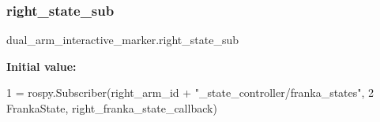 \subsubsection{\texorpdfstring{right\+\_\+state\+\_\+sub}{right\_state\_sub}}
{\footnotesize\ttfamily dual\+\_\+arm\+\_\+interactive\+\_\+marker.\+right\+\_\+state\+\_\+sub}

{\bfseries Initial value\+:}
\begin{DoxyCode}
1 =  rospy.Subscriber(right\_arm\_id + \textcolor{stringliteral}{"\_state\_controller/franka\_states"},
2                                  FrankaState, right\_franka\_state\_callback)
\end{DoxyCode}
